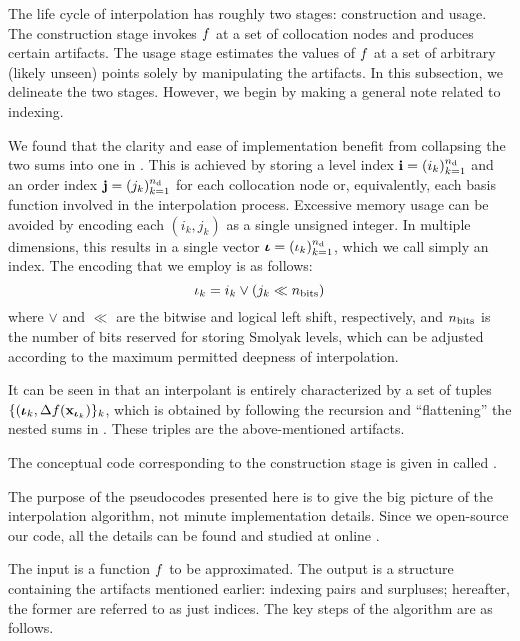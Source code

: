 The life cycle of interpolation has roughly two stages: construction and usage.
The construction stage invokes $f$ at a set of collocation nodes and produces
certain artifacts. The usage stage estimates the values of $f$ at a set of
arbitrary (likely unseen) points solely by manipulating the artifacts. In this
subsection, we delineate the two stages. However, we begin by making a general
note related to indexing.

We found that the clarity and ease of implementation benefit from collapsing the
two sums into one in . This is achieved by storing a level
index $\mathbf{i} = (i_k)_{k = 1}^{n_\text{d}}$ and an order index $\mathbf{j} = (j_k)_{k = 1}^{n_\text{d}}$
for each collocation node or, equivalently, each basis function involved in the
interpolation process. Excessive memory usage can be avoided by encoding each
$(i_k, j_k)$ as a single unsigned integer. In multiple dimensions, this results
in a single vector $\bm{\iota} = (\iota_k)_{k = 1}^{n_\text{d}}$, which we call simply an
index. The encoding that we employ is as follows:
\[
  \iota_k = i_k \lor (j_k \ll n_\text{bits})
\]
where $\lor$ and $\ll$ are the bitwise  and logical left shift,
respectively, and $n_\text{bits}$ is the number of bits reserved for storing
Smolyak levels, which can be adjusted according to the maximum permitted
deepness of interpolation.

It can be seen in  that an interpolant is entirely
characterized by a set of tuples $\{ (\bm{\iota}_k, \Delta f(\mathbf{x}_{\bm{\iota}_k}) \}_k$, which
is obtained by following the recursion and ``flattening'' the nested sums in
. These triples are the above-mentioned artifacts.


The conceptual code corresponding to the construction stage is given in
 called .

\begin{remark}
The purpose of the pseudocodes presented here is to give the big picture of the
interpolation algorithm, not minute implementation details. Since we open-source
our code, all the details can be found and studied at online \cite{sources}.
\end{remark}

The input  is a function $f$ to be approximated. The output
 is a structure containing the artifacts mentioned earlier:
indexing pairs and surpluses; hereafter, the former are referred to as just
indices. The key steps of the  algorithm are as follows.

